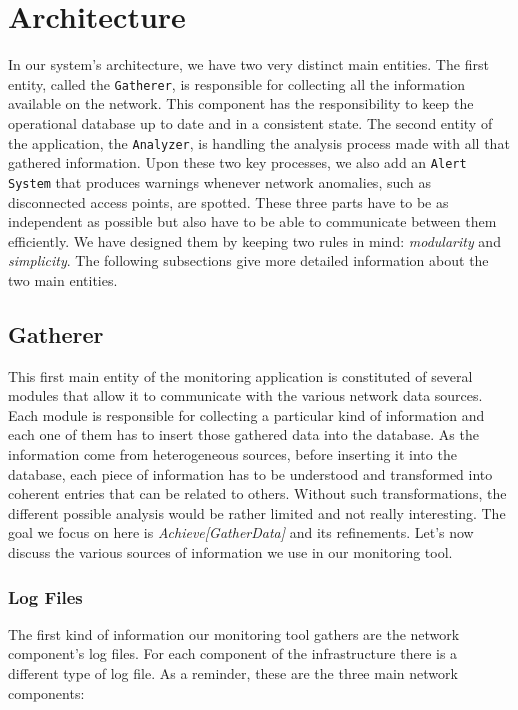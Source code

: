 \section{Architecture}
In our system's architecture, we have two very distinct main entities. The first entity, called the \texttt{Gatherer}, is responsible for collecting all the information available on the network. This component has the responsibility to keep the operational database up to date and in a consistent state. The second entity of the application, the \texttt{Analyzer}, is handling the analysis process made with all that gathered information. Upon these two key processes, we also add an \texttt{Alert System} that produces warnings whenever network anomalies, such as disconnected access points, are spotted. These three parts have to be as independent as possible but also have to be able to communicate between them efficiently. We have designed them by keeping two rules in mind: \textit{modularity} and \textit{simplicity}. The following subsections give more detailed information about the two main entities.

\subsection{Gatherer}
This first main entity of the monitoring application is constituted of several modules that allow it to communicate with the various network data sources. Each module is responsible for collecting a particular kind of information and each one of them has to insert those gathered data into the database. As the information come from heterogeneous sources, before inserting it into the database, each piece of information has to be understood and transformed into coherent entries that can be related to others. Without such transformations, the different possible analysis would be rather limited and not really interesting. The goal we focus on here is \textit{Achieve[GatherData]} and its refinements. Let's now discuss the various sources of information we use in our monitoring tool.

\subsubsection{Log Files}

The first kind of information our monitoring tool gathers are the network component's log files. For each component of the infrastructure there is a different type of log file. As a reminder, these are the three main network components:

